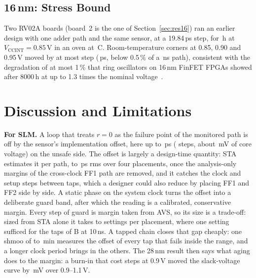 \documentclass[conference]{IEEEtran}
\newcommand{\Vcc}{V_\mathrm{CCINT}}
\begin{document}
\subsection{\texorpdfstring{16\,nm}{16 nm}: Stress Bound}\label{sec:res16bound}

Two RV02A boards (board~2 is the one of Section~\ref{sec:res16}) ran an earlier design with one
adder path and the same sensor, at a 19.84\,ps step, for \vUsDurH\,h at $\Vcc=0.85$\,V in an oven at
\vUsOven\,\textdegree C. Room-temperature corners at 0.85, 0.90 and 0.95\,V moved by at most
\vUsDmax{} step (\vUsDmaxPs\,ps, below 0.5\,\% of a \vUsPathNs\,ns path), consistent with the
degradation of at most 1\,\% that ring oscillators on 16\,nm FinFET FPGAs showed after 8000\,h at up
to 1.3 times the nominal voltage~\cite{sobas24}.

\section{Discussion and Limitations}\label{sec:disc}

\textbf{For SLM.} A loop that treats $r=0$ as the failure point of the monitored path is off by
the sensor's implementation offset, here up to \vAllMinPsAbs\,ps (\vAllMinSt{} steps, about
\vAllMinmV\,mV of core voltage) on the unsafe side. The offset is largely a design-time quantity:
STA estimates it per path, to \vAllRms\,ps rms over four placements, once the analysis-only margins
of the cross-clock FF1 path are removed, and it catches the clock and setup steps between taps,
which a designer could also reduce by placing FF1 and FF2 side by side. A static phase on the
system clock turns the offset into a deliberate guard band, after which the reading is a
calibrated, conservative margin. Every step of guard is margin taken from AVS, so its size is a
trade-off: sized from STA alone it takes \vGuardPlSetLo{} to \vGuardPlSetHi{} settings per
placement, where one setting sufficed for the taps of B at 10\,ns. A tapped chain closes that gap
cheaply: one shmoo of \vShmooMinLo{} to \vShmooMinHi\,min measures the offset of every tap that
fails inside the range, and a longer clock period brings in the others. The 28\,nm result then says
what aging does to the margin: a
burn-in that cost \vDslackLoAbs{} steps at 0.9\,V moved the slack-voltage curve by \vShiftmV\,mV
over 0.9--1.1\,V.
\end{document}
